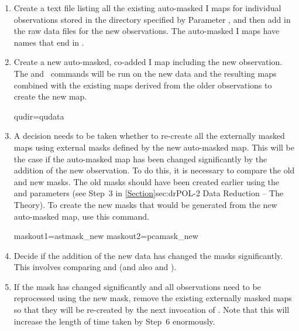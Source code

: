 \begin{enumerate}

\item Create a text file listing all the existing auto-masked I maps
  for individual observations stored in the directory specified by
  Parameter , and then add in the raw data files for the new
  observations. The auto-masked I maps have names that end in
  .

\begin{terminalv}
\end{terminalv}


\item Create a new auto-masked, co-added I map including the new
  observation. The  and \makemap\ commands
  will be run on the new
  data and the resulting maps combined with the existing maps derived
  from the older observations to create the new map.

\begin{terminalv}
     qudir=qudata
\end{terminalv}


\item A decision needs to be taken whether to re-create all the
  externally masked maps using external masks defined by the new
  auto-masked map. This will be the case if the auto-masked map has
  been changed significantly by the addition of the new
  observation. To do this, it is necessary to compare the old and new
  masks. The old masks should have been created earlier using the
   and  parameters (see Step~3 in
  \cref{Section}{sec:dr}{POL-2 Data Reduction -- The Theory}). To
  create the new masks that would be generated from the new
  auto-masked map, use this command.

\begin{terminalv}
     maskout1=astmask_new  maskout2=pcamask_new
\end{terminalv}

\item Decide if the addition of the new data has changed the masks
  significantly. This involves comparing  and
   (and also  and
  ).


\item If the mask has changed significantly and all observations need
  to be reprocessed using the new mask, remove the existing
  externally masked maps so that they will be re-created by the next
  invocation of .  Note that this will increase the length of time
  taken by Step~6 enormously.


\end{enumerate}
